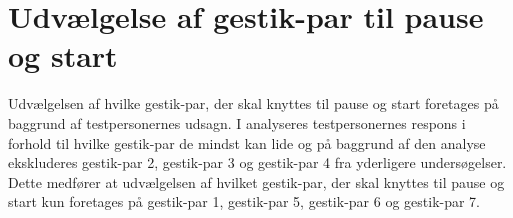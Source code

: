 \section{Udvælgelse af gestik-par til pause og start}
\label{TestresultaterPauseStart}
%
Udvælgelsen af hvilke gestik-par, der skal knyttes til pause og start foretages på baggrund af testpersonernes udsagn. I  analyseres testpersonernes respons i forhold til hvilke gestik-par de mindst kan lide og på baggrund af den analyse ekskluderes gestik-par 2, gestik-par 3 og gestik-par 4 fra yderligere undersøgelser. Dette medfører at udvælgelsen af hvilket gestik-par, der skal knyttes til pause og start kun foretages på gestik-par 1, gestik-par 5, gestik-par 6 og gestik-par 7. \blankline
%  



